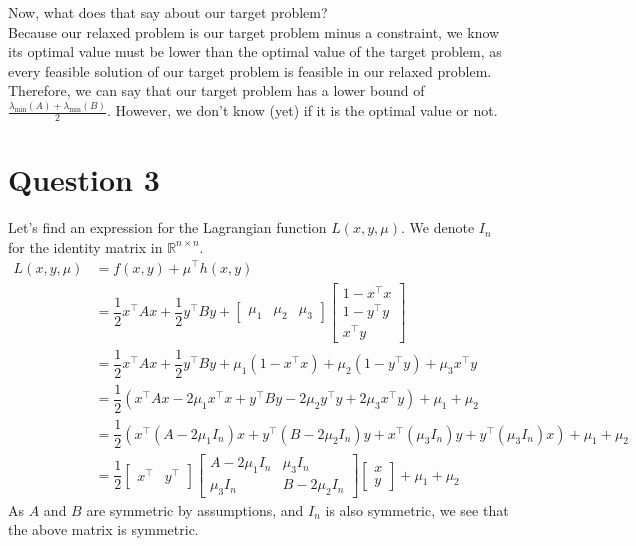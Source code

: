 \documentclass{article}
\newcommand{\R}{\mathbb{R}}
\newcommand{\tp}{^\top}
\newcommand{\fxy}{\dfrac{1}{2}x\tp A x + \dfrac{1}{2} y\tp B y}
\newcommand{\hxy}{\begin{bmatrix}
1-x\tp x\\
1-y\tp y\\
x\tp y
\end{bmatrix}}
\begin{document}
Now, what does that say about our target problem?\\
Because our relaxed problem is our target problem minus a constraint, we know its optimal value must be lower than the optimal value of the target problem, as every feasible solution of our target problem is feasible in our relaxed problem. Therefore, we can say that our target problem has a lower bound of $\frac{\lambda_{\min} (A)+\lambda_{\min} (B)}{2}$. However, we don't know (yet) if it is the optimal value or not.

\section*{Question 3}
Let's find an expression for the Lagrangian function $L(x,y,\mu)$. We denote $I_n$ for the identity matrix in $\R^{n\times n}$.
\begin{align*}
L(x,y,\mu) &= f(x,y)+\mu\tp h(x,y) \\
&=\fxy  + \begin{bmatrix} \mu_1 &\mu_2 & \mu_3 \end{bmatrix} \hxy \\
&=\fxy + \mu_1(1-x\tp x) +\mu_2(1-y\tp y) + \mu_3 x\tp y \\
&= \dfrac{1}{2}\left(x\tp A x - 2\mu_1 x\tp x +  y\tp B y -2\mu_2 y\tp y + 2\mu_3 x\tp y\right) + \mu_1+\mu_2 \\
&= \dfrac{1}{2} \left(x\tp  \left( A - 2\mu_1 I_n \right) x +  y\tp \left( B -2\mu_2 I_n \right) y   + x\tp  \left( \mu_3 I_n \right) y+ y\tp \left( \mu_3 I_n \right) x \right) + \mu_1+\mu_2 \\
&= \dfrac{1}{2} \begin{bmatrix} x\tp & y\tp\end{bmatrix}
\begin{bmatrix} A-2\mu_1 I_n & \mu_3 I_n \\
\mu_3 I_n & B-2\mu_2 I_n \end{bmatrix}
\begin{bmatrix} x \\ y \end{bmatrix} +\mu_1+\mu_2 
\end{align*}
As $A$ and $B$ are symmetric by assumptions, and $I_n$ is also symmetric, we see that the above matrix is symmetric.
\end{document}
